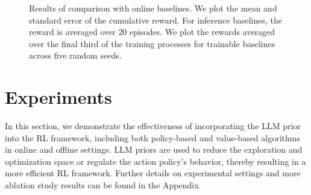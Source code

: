 \documentclass{article} %
\theoremstyle{plain}
\theoremstyle{definition}
\theoremstyle{remark}
\begin{document}
{\begin{figure}[t!]
    \caption{{Results of comparison with online baselines. We plot the mean and standard error of the cumulative reward. For inference baselines, the reward is averaged over $20$ episodes. We plot the rewards averaged over the final third of the training processes for trainable baselines across five random seeds. %
    }}%
\label{fig:baselinesdqn}
\end{figure}


\section{Experiments}
\label{sec: exp}

In this section, we demonstrate the effectiveness of incorporating the LLM prior into the RL framework, including both policy-based and value-based algorithms in online and offline settings. LLM priors are used to reduce the exploration and optimization space or regulate the action policy's behavior, thereby resulting in a more efficient RL framework. %
Further details on experimental settings and more ablation study results can be found in the Appendix.
}
\end{document}
